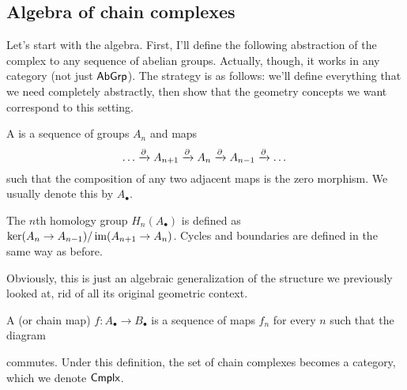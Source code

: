 \subsection{Algebra of chain complexes}
Let's start with the algebra.
First, I'll define the following abstraction of the complex to any sequence of abelian groups.
Actually, though, it works in any category (not just $\mathsf{AbGrp}$).
The strategy is as follows: we'll define everything that we need completely abstractly,
then show that the geometry concepts we want correspond to this setting.

\begin{definition}
	A  is a sequence of groups $A_n$ and maps
	\[ \dots \xrightarrow{\partial} A_{n+1} \xrightarrow{\partial}
		A_n \xrightarrow{\partial} A_{n-1} \xrightarrow{\partial} \dots \]
	such that the composition of any two adjacent maps is the zero morphism.
	We usually denote this by $A_\bullet$.

	The $n$th homology group $H_n(A_\bullet)$ is defined
	as $\ker(A_n \to A_{n-1}) / \operatorname{im}(A_{n+1} \to A_n)$.
	Cycles and boundaries are defined in the same way as before.
\end{definition}
Obviously, this is just an algebraic generalization of the structure we previously looked at,
rid of all its original geometric context.

\begin{definition}
	A  (or chain map) $f \colon A_\bullet \to B_\bullet$ is
	a sequence of maps $f_n$ for every $n$ such that the diagram
	\begin{center}
	\end{center}
	commutes.
	Under this definition, the set of chain complexes becomes a category,
	which we denote $\mathsf{Cmplx}$.
\end{definition}

